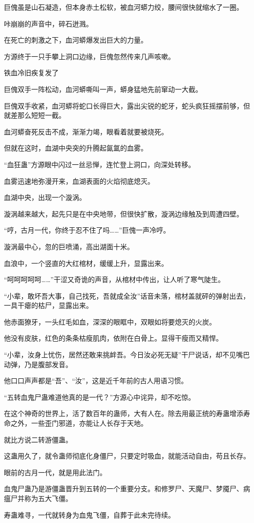 \begin{this_body}
巨傀虽是山石凝造，但本身赤土松软，被血河蟒力绞，腰间很快就缩水了一圈。

咔崩崩的声音中，碎石迸溅。

在死亡的刺激之下，血河蟒爆发出巨大的力量。

方源终于一只手攀上洞口边缘，巨傀忽然传来几声咳嗽。

铁血冷旧疾复发了

巨傀双手一阵松动，血河蟒嘶叫一声，蟒身猛地先前窜动一大截。

巨傀双手收紧，血河蟒将蛇口长得巨大，露出尖锐的蛇牙，蛇头疯狂摇摆前够，但就差那么短短一截。

血河蟒奋死反击不成，渐渐力竭，眼看着就要被烧死。

但就在这时，血湖中央突的升腾起氤氲的血雾。

“血狂蛊”方源眼中闪过一丝忌惮，连忙登上洞口，向深处转移。

血雾迅速地弥漫开来，血湖表面的火焰彻底熄灭。

血湖中央，出现一个漩涡。

漩涡越来越大，起先只是在中央地带，但很快扩散，漩涡边缘触及到周遭四壁。

“哼，古月一代，你终于忍不住了吗……”巨傀一声冷哼。

漩涡最中心，忽的巨喷涌，高出湖面十米。

血浪中，一个竖直的大红棺材，缓缓上升，显露出来。

“呵呵呵呵呵……”干涩又奇诡的声音，从棺材中传出，让人听了寒气陡生。

“小辈，敢坏吾大事，自己找死，吾就成全汝”话音未落，棺材盖就砰的弹射出去，一具干瘪的枯尸，显露出来。

他赤面獠牙，一头红毛如血，深深的眼眶中，双眼如将要熄灭的火炭。

他没有皮肤，红色的条条枯瘦肌肉，依附在白骨上。显得干瘦而又精悍。

“小辈，汝身上忧伤，居然还敢来挑衅吾。今日汝必死无疑”干尸说话，却不见嘴巴动弹，乃是腹部发音。

他口口声声都是“吾”、“汝”，这是近千年前的古人用语习惯。

“五转血鬼尸蛊难道他真的是一代？”方源心中诧异，却不吃惊。

在这个神奇的世界上，活了数百年的蛊师，大有人在。除去用最正统的寿蛊增添寿命之外，一些歪门邪道，亦能让人长存于天地。

就比方说二转游僵蛊。

这蛊用久了，就令蛊师彻底化身僵尸，只要定时吸血，就能活动自由，苟且长存。

眼前的古月一代，就是用此法门。

血鬼尸蛊乃是游僵蛊晋升到五转的一个重要分支。和修罗尸、天魔尸、梦魇尸、病瘟尸并称为五大飞僵。

寿蛊难寻，一代就转身为血鬼飞僵，自葬于此未完待续。

\end{this_body}

